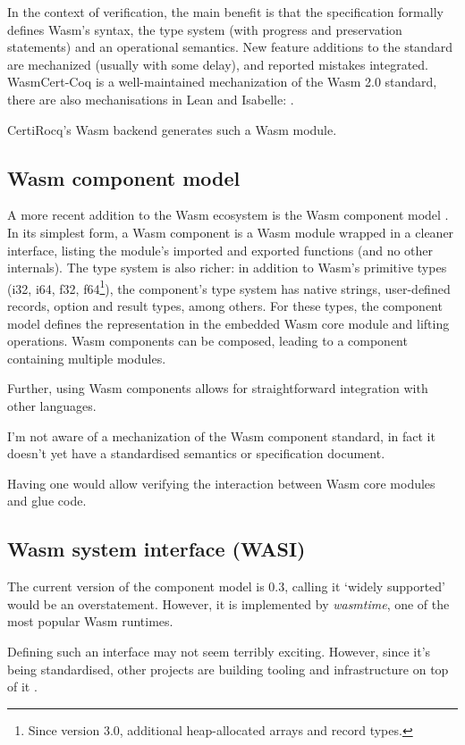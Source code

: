 \documentclass[12pt,a4paper]{report}
\begin{document}
In the context of verification, the main benefit is that the specification formally defines Wasm's syntax, the type system (with progress and preservation statements)
and an operational semantics. New feature additions to the standard are mechanized (usually with some delay), and reported mistakes integrated.
WasmCert-Coq is a well-maintained mechanization of the Wasm 2.0 standard, there are also mechanisations in Lean and Isabelle: .

CertiRocq's Wasm backend generates such a Wasm module.

\subsection{Wasm component model}
A more recent addition to the Wasm ecosystem is the Wasm component model \todo{}.
In its simplest form, a Wasm component is a Wasm module wrapped in a cleaner interface, listing the module's imported and exported functions (and no other internals).
The type system is also richer: in addition to Wasm's primitive types (i32, i64, f32, f64\footnote{Since version 3.0, additional heap-allocated arrays and record types.}),
the component's type system has native strings, user-defined records, option and result types, among others.
For these types, the component model defines the representation in the embedded Wasm core module and lifting operations.
Wasm components can be composed, leading to a component containing multiple modules. 

Further, using Wasm components allows for straightforward integration with other languages.


I'm not aware of a mechanization of the Wasm component standard, in fact it doesn't yet have a standardised semantics or specification document.

Having one would allow verifying the interaction between Wasm core modules and glue code.

\subsection{Wasm system interface (WASI)}

The current version of the component model is 0.3, calling it `widely supported' would be an overstatement.
However, it is implemented by \textit{wasmtime}, one of the most popular Wasm runtimes.



Defining such an interface may not seem terribly exciting. However, since it's being standardised, other projects are building tooling and infrastructure on top of it
\cite{wasi.dev}.
\end{document}
